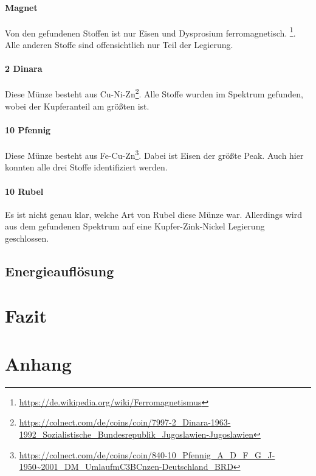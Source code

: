 \documentclass[12pt,a4paper]{article}
\begin{document}
\paragraph{Magnet}
Von den gefundenen Stoffen ist nur Eisen und Dysprosium ferromagnetisch. \footnote{\url{https://de.wikipedia.org/wiki/Ferromagnetismus}}. Alle anderen Stoffe sind offensichtlich nur Teil der Legierung.

\paragraph{2 Dinara}
Diese Münze besteht aus Cu-Ni-Zn\footnote{\url{https://colnect.com/de/coins/coin/7997-2_Dinara-1963-1992_Sozialistische_Bundesrepublik_Jugoslawien-Jugoslawien}}. Alle Stoffe wurden im Spektrum gefunden, wobei der Kupferanteil am größten ist.

\paragraph{10 Pfennig}
Diese Münze besteht aus Fe-Cu-Zn\footnote{\url{https://colnect.com/de/coins/coin/840-10_Pfennig_A_D_F_G_J-1950~2001_DM_UmlaufmC3BCnzen-Deutschland_BRD}}. Dabei ist Eisen der größte Peak. Auch hier konnten alle drei Stoffe identifiziert werden.

\paragraph{10 Rubel}
Es ist nicht genau klar, welche Art von Rubel diese Münze war. Allerdings wird aus dem gefundenen Spektrum auf eine Kupfer-Zink-Nickel Legierung geschlossen.


\subsection{Energieauflösung}

\section{Fazit}
\section{Anhang}
\end{document}

